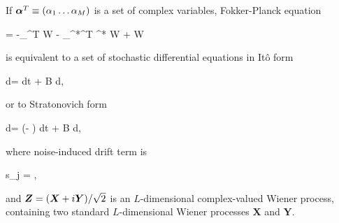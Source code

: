 \begin{theorem}
\label{thm:wigner-bec:fpe:fpe-sde-complex}
	If $\boldsymbol{\alpha}^T \equiv (\alpha_1 \ldots \alpha_M)$ is a set of complex variables,
	Fokker-Planck equation
	\begin{eqn*}
		= -\bpartial_{\balpha}^T \avec W - \bpartial_{\balpha^*}^T \avec^* W
		+  W
	\end{eqn*}
	is equivalent to a set of stochastic differential equations in It\^{o} form
	\begin{eqn*}
		d\balpha = \avec dt + B d\Zvec,
	\end{eqn*}
	or to Stratonovich form
	\begin{eqn*}
		d\balpha = (\avec - \svec) dt + B d\Zvec,
	\end{eqn*}
	where noise-induced drift term is
	\begin{eqn*}
		s_j =  \Trace{ B^H \bpartial_{\balpha^*} \evec_j^T B },
	\end{eqn*}
	and $\boldsymbol{Z} = (\bm{X} + i\bm{Y}) / \sqrt{2}$ is an $L$-dimensional complex-valued Wiener process,
	containing two standard $L$-dimensional Wiener processes $\bm{X}$ and $\bm{Y}$.
\end{theorem}
